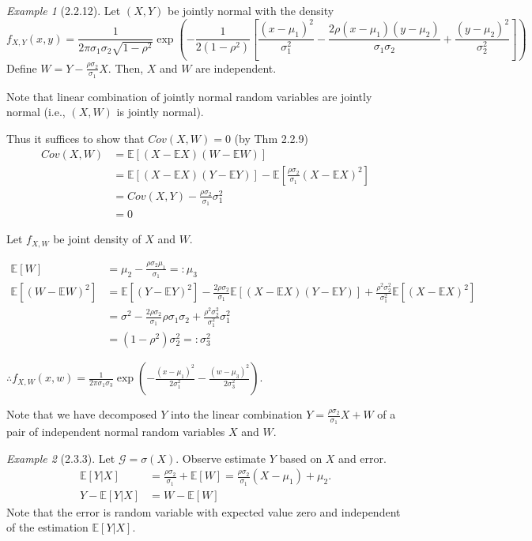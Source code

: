 \documentclass[12pt]{report}
\renewcommand{\1}{\mathbb{1}}
\theoremstyle{break}
\theoremstyle{newdef}
\theoremstyle{remark}
\newtheorem*{exmp}{Example} %
\begin{document}
\begin{appendices}
\begin{exmp}[2.2.12]
Let $(X,Y)$ be jointly normal with the density
$$
f_{X,Y}(x,y) = \frac{1}{2\pi \sigma_1\sigma_2 \sqrt{1-\rho^2}}
\exp \left(-\frac{1}{2(1-\rho^2)} \left[\frac{(x-\mu_1)^2}{\sigma_1^2} - \frac{2\rho(x-\mu_1)(y-\mu_2)}{\sigma_1\sigma_2} + \frac{(y-\mu_2)^2}{\sigma_2^2}\right]\right)$$
Define $W = Y - \frac{\rho\sigma_2}{\sigma_1} X$.
Then, $X$ and $W$ are independent.

Note that linear combination of jointly normal random variables are jointly normal
(i.e., $(X,W)$ is jointly normal).

Thus it suffices to show that $Cov(X,W) = 0$ (by Thm 2.2.9)
$$
\begin{aligned}
Cov(X,W) &= \mathbb{E}[(X-\mathbb{E}X)(W-\mathbb{E}W)]\\
&= \mathbb{E}[(X-\mathbb{E}X)(Y-\mathbb{E}Y)] - \mathbb{E}[\frac{\rho\sigma_2}{\sigma_1}(X-\mathbb{E}X)^2]\\
&= Cov(X,Y) - \frac{\rho\sigma_2}{\sigma_1}\sigma_1^2\\
&= 0
\end{aligned}
$$

Let $f_{X,W}$ be joint density of $X$ and $W$.

$$
\begin{aligned}
\mathbb{E}[W] &= \mu_2 - \frac{\rho\sigma_2\mu_1}{\sigma_1} =: \mu_3\\
\mathbb{E}[(W-\mathbb{E}W)^2] &= \mathbb{E}[(Y-\mathbb{E}Y)^2] - \frac{2\rho\sigma_2}{\sigma_1}\mathbb{E}[(X-\mathbb{E}X)(Y-\mathbb{E}Y)] + \frac{\rho^2\sigma_2^2}{\sigma_1^2}\mathbb{E}[(X-\mathbb{E}X)^2]\\
&= \sigma^2 - \frac{2\rho\sigma_2}{\sigma_1}\rho\sigma_1\sigma_2 + \frac{\rho^2\sigma_2^2}{\sigma_1^2}\sigma_1^2\\
&=(1-\rho^2)\sigma_2^2 =: \sigma_3^2
\end{aligned}
$$

$\therefore f_{X,W}(x,w) = \frac{1}{2\pi\sigma_1\sigma_3} \exp\left(-\frac{(x-\mu_1)^2}{2\sigma_1^2} - \frac{(w-\mu_3)^2}{2\sigma_3^2}\right)$.

Note that we have decomposed $Y$ into the linear combination $Y = \frac{\rho\sigma_2}{\sigma_1}X + W$ of a pair of independent normal random variables $X$ and $W$.

\end{exmp}

\vspace{5mm}

\begin{exmp}[2.3.3]
Let $\mathcal{G} = \sigma(X)$. Observe estimate $Y$ based on $X$ and error.
$$
\begin{aligned}
\mathbb{E}[Y|X] &= \frac{\rho\sigma_2}{\sigma_1} + \mathbb{E}[W] = \frac{\rho\sigma_2}{\sigma_1}(X-\mu_1) + \mu_2.\\
Y-\mathbb{E}[Y|X] &= W - \mathbb{E}[W]
\end{aligned}
$$
Note that the error is random variable with expected value zero and independent of the estimation $\mathbb{E}[Y|X]$.
\end{exmp}

\end{appendices}
\end{document}

